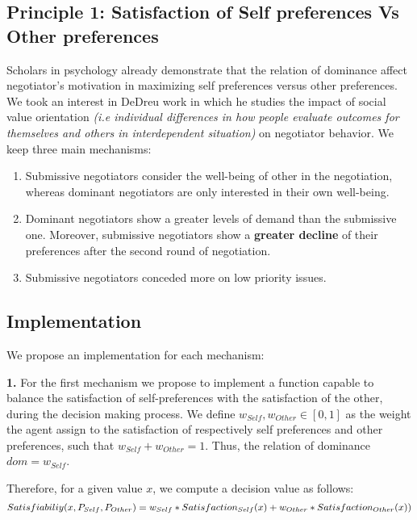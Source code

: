\documentclass{article}
\begin{document}
	
	
	\subsection{Principle 1: Satisfaction of Self preferences Vs Other preferences}
	Scholars in psychology already demonstrate that the relation of dominance affect negotiator's motivation in maximizing self preferences versus other preferences. We took an interest in DeDreu work in which he studies the impact of social value orientation \textit{(i.e  individual differences in	how people evaluate outcomes for themselves and others	in interdependent situation)} on negotiator behavior. We keep three main mechanisms:
	\begin{enumerate}
		\item Submissive negotiators consider the well-being of other in the negotiation, whereas dominant negotiators are only interested in their own well-being.
		\item Dominant negotiators show a greater levels of demand than the submissive one. Moreover, submissive negotiators show a \textbf{greater decline} of their preferences after the second round of negotiation. 
		\item Submissive negotiators conceded more on low priority issues.
	\end{enumerate}   
	
	
	
	
	\subsection{Implementation}
	We propose an implementation for each mechanism:
	
	\textbf{1.} For the first mechanism we propose to implement a function capable to balance the satisfaction of self-preferences with the satisfaction of the other, during the decision making process.
	We define $w_{Self}, w_{Other}  \in [0, 1]$ as the weight the agent assign to the satisfaction of respectively  self preferences and other preferences, such that $w_{Self}+ w_{Other} = 1$. Thus, the relation of dominance $dom = w_{Self}$.
	
	Therefore, for a given value $x$,  we compute a decision value as follows:
	\begin{dmath}
	$$Satisfiabiliy(x,P_{Self},P_{Other}) = w_{Self} * Satisfaction_{Self}(x) + w_{Other} * Satisfaction_{Other}(x))$$
	\end{dmath}
	
\end{document}
